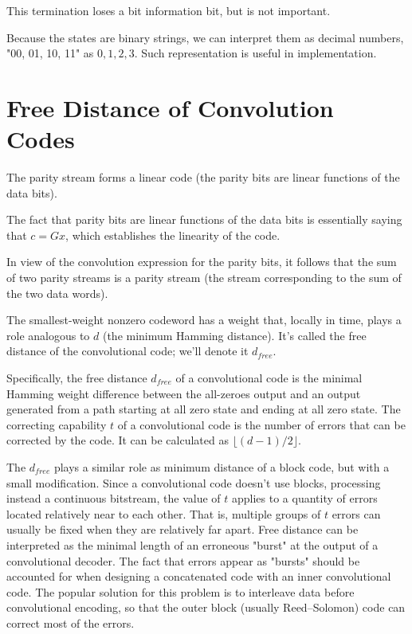 This termination loses a bit information bit, but is not important. 

Because the states are binary strings, we can  interpret them as decimal numbers, 
  "00, 01, 10, 11" as \(0,1, 2, 3\). Such representation is useful in implementation.

\section{Free Distance of Convolution Codes}

The parity stream forms a linear code (the parity bits are linear functions of the data bits).

The fact that parity bits are linear functions of the data bits is essentially saying that \(c=Gx\), which establishes the linearity of the code.

 In view of the convolution expression for the parity bits, it follows that the sum of two
  parity streams is a parity stream (the stream corresponding to the sum of the two data words).

The smallest-weight nonzero codeword has a weight that, locally in time, plays a role analogous to \(d\) (the minimum Hamming distance). It's called the free distance of the convolutional code; we'll denote
it \(d_{free}\).

Specifically, the free distance \(d_{free}\) of a convolutional code is the minimal Hamming weight difference between the all-zeroes output and an output generated from a path starting at  all zero state and ending at all zero state. The correcting capability \(t\) of a convolutional code is the number of errors that can be corrected by the code. It can be calculated as
\(\lfloor (d-1)/2 \rfloor \). 

The \(d_{free}\) plays a similar role as minimum distance of a block code, but with a small modification. Since a convolutional code doesn't use blocks, processing instead a continuous bitstream, the value of \(t\) applies to a quantity of errors located relatively near to each other. That is, multiple groups of \(t\) errors can usually be fixed when they are relatively far apart. Free distance can be interpreted as the minimal length of an erroneous "burst" at the output of a convolutional decoder. The fact that errors appear as "bursts" should be accounted for when designing a concatenated code with an inner convolutional code. The popular solution for this problem is to interleave data before convolutional encoding, so that the outer block (usually Reed–Solomon) code can correct most of the errors.

